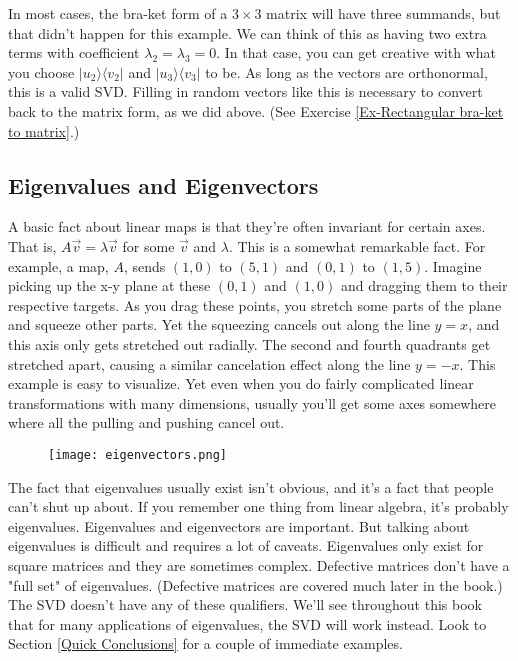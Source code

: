 \documentclass{amsbook}
\begin{document}
In most cases, the bra-ket form of a $3\times3$ matrix will have three summands, but that didn't happen for this example.  We can think of this as having two extra terms with coefficient $\lambda_2=\lambda_3=0$.  In that case, you can get creative with what you choose $|u_2\rangle\langle v_2|$ and $|u_3\rangle\langle v_3|$ to be.  As long as the vectors are orthonormal, this is a valid SVD.  Filling in random vectors like this is necessary to convert back to the matrix form, as we did above.  (See Exercise \ref{Ex-Rectangular bra-ket to matrix}.)

\subsection{Eigenvalues and Eigenvectors}

A basic fact about linear maps is that they're often invariant for certain axes.  That is, $A\vec v=\lambda\vec v$ for some $\vec v$ and $\lambda$.  This is a somewhat remarkable fact.  For example, a map, $A$, sends $(1, 0)$ to $(5, 1)$ and $(0, 1)$ to $(1, 5)$.  Imagine picking up the x-y plane at these $(0, 1)$ and $(1, 0)$ and dragging them to their respective targets.  As you drag these points, you stretch some parts of the plane and squeeze other parts.  Yet the squeezing cancels out along the line $y=x$, and this axis only gets stretched out radially.  The second and fourth quadrants get stretched apart, causing a similar cancelation effect along the line $y=-x$.  This example is easy to visualize.  Yet even when you do fairly complicated linear transformations with many dimensions, usually you'll get some axes somewhere where all the pulling and pushing cancel out.

\begin{figure}
\centering
\texttt{[image: eigenvectors.png]}
\end{figure}

The fact that eigenvalues usually exist isn't obvious, and it's a fact that people can't shut up about.  If you remember one thing from linear algebra, it's probably eigenvalues.  Eigenvalues and eigenvectors are important.  But talking about eigenvalues is difficult and requires a lot of caveats.  Eigenvalues only exist for square matrices and they are sometimes complex.  Defective matrices don't have a "full set" of eigenvalues.  (Defective matrices are covered much later in the book.)  The SVD doesn't have any of these qualifiers.  We'll see throughout this book that for many applications of eigenvalues, the SVD will work instead.  Look to Section \ref{Quick Conclusions} for a couple of immediate examples.
\end{document}
